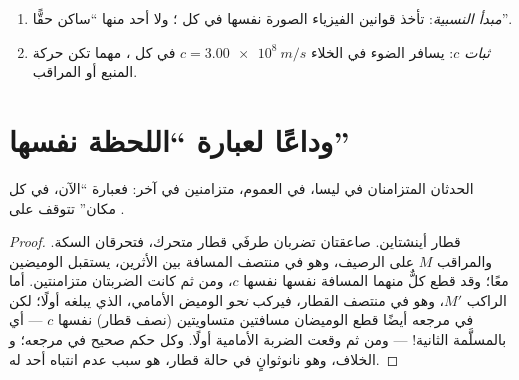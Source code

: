 \begin{theorem}\label{thm:g12:special-relativity:postulates}
\begin{enumerate}
  \item \emph{مبدأ النسبية}: تأخذ قوانين الفيزياء الصورة
        نفسها في كل ؛ ولا أحد منها ``ساكن حقًّا''.
  \item \emph{ثبات $c$}: يسافر الضوء في الخلاء 
        $c = \qty{3.00e8}{m/s}$ في كل ، مهما تكن
        حركة المنبع أو المراقب.
\end{enumerate}
\end{theorem}
\admitted

\section{وداعًا لعبارة ``اللحظة نفسها''}

\begin{proposition}\label{prop:g12:special-relativity:simultaneity}
الحدثان المتزامنان في  ليسا، في العموم،
متزامنين في  آخر: فعبارة ``الآن، في كل مكان'' تتوقف على .
\end{proposition}

\begin{proof}
قطار أينشتاين. صاعقتان تضربان طرفَي قطار متحرك،
فتحرقان السكة. والمراقب $M$ على الرصيف، وهو في منتصف المسافة بين
الأثرين، يستقبل الوميضين معًا؛ وقد قطع كلٌّ منهما المسافة نفسها 
نفسها $c$، ومن ثم كانت الضربتان متزامنتين. أما الراكب $M'$،
وهو في منتصف القطار، فيركب \emph{نحو} الوميض الأمامي، الذي يبلغه
أولًا؛ لكن في مرجعه أيضًا قطع الوميضان مسافتين متساويتين (نصف
قطار)  نفسها $c$ --- أي بالمسلَّمة الثانية! --- ومن ثم وقعت الضربة
الأمامية أولًا. وكل حكم صحيح في مرجعه؛ و
الخلاف، وهو نانوثوانٍ في حالة قطار، هو سبب عدم انتباه أحد له.
\end{proof}

